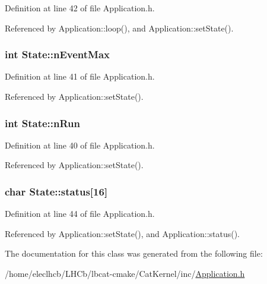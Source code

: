 Definition at line 42 of file Application.h.

Referenced by Application::loop(), and Application::setState().\hypertarget{classState_ac57f536cfe9e9819dfc891ed00dabfe3}{
\subsubsection[{nEventMax}]{\setlength{\rightskip}{0pt plus 5cm}int {\bf State::nEventMax}}}
\label{classState_ac57f536cfe9e9819dfc891ed00dabfe3}


Definition at line 41 of file Application.h.

Referenced by Application::setState().\hypertarget{classState_aa29a124a8d6060a02bd2468480d7bbd3}{
\subsubsection[{nRun}]{\setlength{\rightskip}{0pt plus 5cm}int {\bf State::nRun}}}
\label{classState_aa29a124a8d6060a02bd2468480d7bbd3}


Definition at line 40 of file Application.h.

Referenced by Application::setState().\hypertarget{classState_aaec062c78d5602d066a7960a2e08e1cd}{
\subsubsection[{status}]{\setlength{\rightskip}{0pt plus 5cm}char {\bf State::status}\mbox{[}16\mbox{]}}}
\label{classState_aaec062c78d5602d066a7960a2e08e1cd}


Definition at line 44 of file Application.h.

Referenced by Application::setState(), and Application::status().

The documentation for this class was generated from the following file:\begin{DoxyCompactItemize}
\item 
/home/eleclhcb/LHCb/lbcat-\/cmake/CatKernel/inc/\hyperlink{Application_8h}{Application.h}\end{DoxyCompactItemize}
